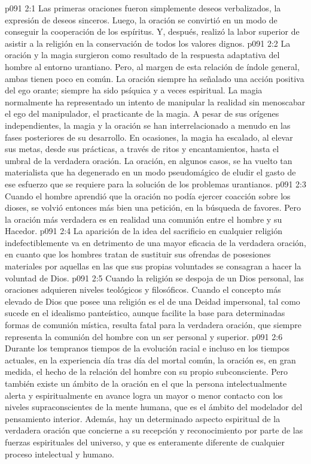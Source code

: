 \vs p091 2:1 Las primeras oraciones fueron simplemente deseos verbalizados, la expresión de deseos sinceros. Luego, la oración se convirtió en un modo de conseguir la cooperación de los espíritus. Y, después, realizó la labor superior de asistir a la religión en la conservación de todos los valores dignos.
\vs p091 2:2 La oración y la magia surgieron como resultado de la respuesta adaptativa del hombre al entorno urantiano. Pero, al margen de esta relación de índole general, ambas tienen poco en común. La oración siempre ha señalado una acción positiva del ego orante; siempre ha sido psíquica y a veces espiritual. La magia normalmente ha representado un intento de manipular la realidad sin menoscabar el ego del manipulador, el practicante de la magia. A pesar de sus orígenes independientes, la magia y la oración se han interrelacionado a menudo en las fases posteriores de su desarrollo. En ocasiones, la magia ha escalado, al elevar sus metas, desde sus prácticas, a través de ritos y encantamientos, hasta el umbral de la verdadera oración. La oración, en algunos casos, se ha vuelto tan materialista que ha degenerado en un modo pseudomágico de eludir el gasto de ese esfuerzo que se requiere para la solución de los problemas urantianos.
\vs p091 2:3 \pc Cuando el hombre aprendió que la oración no podía ejercer coacción sobre los dioses, se volvió entonces más bien una petición, en la búsqueda de favores. Pero la oración más verdadera es en realidad una comunión entre el hombre y su Hacedor.
\vs p091 2:4 \pc La aparición de la idea del sacrificio en cualquier religión indefectiblemente va en detrimento de una mayor eficacia de la verdadera oración, en cuanto que los hombres tratan de sustituir sus ofrendas de posesiones materiales por aquellas en las que sus propias voluntades se consagran a hacer la voluntad de Dios.
\vs p091 2:5 Cuando la religión se despoja de un Dios personal, las oraciones adquieren niveles teológicos y filosóficos. Cuando el concepto más elevado de Dios que posee una religión es el de una Deidad impersonal, tal como sucede en el idealismo panteístico, aunque facilite la base para determinadas formas de comunión mística, resulta fatal para la verdadera oración, que siempre representa la comunión del hombre con un ser personal y superior.
\vs p091 2:6 Durante los tempranos tiempos de la evolución racial e incluso en los tiempos actuales, en la experiencia día tras día del mortal común, la oración es, en gran medida, el hecho de la relación del hombre con su propio subconsciente. Pero también existe un ámbito de la oración en el que la persona intelectualmente alerta y espiritualmente en avance logra un mayor o menor contacto con los niveles supraconscientes de la mente humana, que es el ámbito del modelador del pensamiento interior. Además, hay un determinado aspecto espiritual de la verdadera oración que concierne a su recepción y reconocimiento por parte de las fuerzas espirituales del universo, y que es enteramente diferente de cualquier proceso intelectual y humano.
